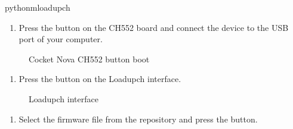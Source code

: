 \documentclass[letterpaper,10pt,english]{sphinxmanual}
\begin{document}
\begin{sphinxVerbatim}[commandchars=\\\{\}]
python\PYGZhy{}mloadupch
\end{sphinxVerbatim}
\begin{enumerate}
%
\setcounter{enumi}{2}
\item {} 
\sphinxAtStartPar
Press the  button on the CH552 board and connect the device to the USB port of your computer.

\end{enumerate}

\begin{figure}[htbp]
\centering
\capstart

\noindent{}
\caption{Cocket Nova CH552 button boot}\label{\detokenize{examples:id1}}\label{\detokenize{examples:figure-flash2}}\end{figure}
\begin{enumerate}
%
\setcounter{enumi}{3}
\item {} 
\sphinxAtStartPar
Press the  button on the Loadupch interface.

\end{enumerate}

\begin{figure}[htbp]
\centering
\capstart

\noindent{}
\caption{Loadupch interface}\label{\detokenize{examples:id2}}\label{\detokenize{examples:figure-connect2}}\end{figure}
\begin{enumerate}
%
\setcounter{enumi}{4}
\item {} 
\sphinxAtStartPar
Select the firmware file from the  repository and press the  button.

\end{enumerate}
\end{document}
